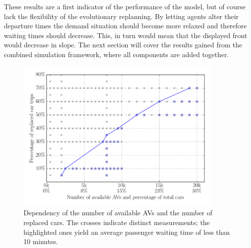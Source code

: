 These results are a first indicator of the performance of the model, but of course
lack the flexibility of the evolutionary replanning. By letting agents alter their
departure times the demand situation should become more relaxed and therefore
waiting times should decrease. This, in turn would mean that the displayed front
would decrease in slope. The next section will cover the results gained from the
combined simulation framework, where all components are added together.

\begin{figure}
    \centering
    \includegraphics[width=0.9\textwidth]{figures/replacementwaiting.pdf}
    \caption{Dependency of the number of available AVs and the number of replaced
    cars. The crosses indicate distinct measurements; the highlighted ones yield
    an average passenger waiting time of less than 10 minutes.}
    \label{fig:replacementwaiting}
\end{figure}
